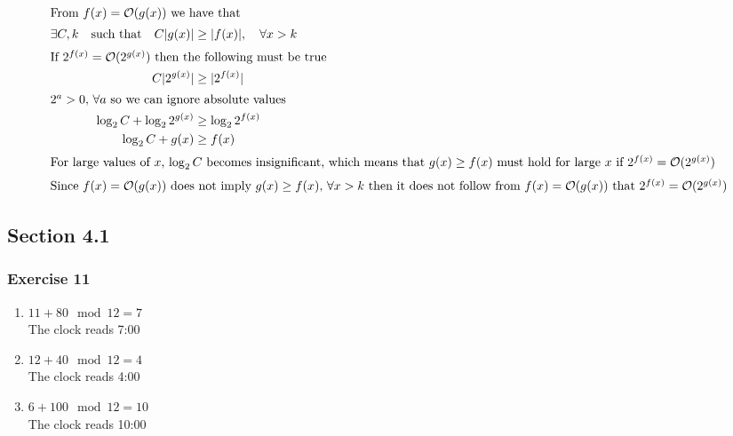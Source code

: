 \documentclass[a4paper]{article}
\newcommand{\ex}[1]{\subsubsection*{#1}}
\begin{document}
\begin{align}
    \intertext{From \(f(x) = \mathcal{O}(g(x))\) we have that}
    \exists C, k \quad \text{such\ that} \quad C|g(x)| &\geq |f(x)|, \quad \forall x > k \\
    \intertext{If \(2^{f(x)} = \mathcal{O}(2^{g(x)})\) then the following must be true}
    C|2^{g(x)}| &\geq |2^{f(x)}| \\
    \intertext{\(2^a > 0, \,  \forall a\) so we can ignore absolute values}
    \log_2 C + \log_22^{g(x)} &\geq \log_22^{f(x)} \\
    \log_2 C + g(x) &\geq f(x) \\
    \intertext{For large values of \(x\), \(\log_2 C\) becomes insignificant,
        which means that \(g(x) \geq f(x)\) must hold for large \(x\) if \(2^{f(x)}
        = \mathcal{O}(2^{g(x)})\)}
    \intertext{Since \(f(x) = \mathcal{O}(g(x))\) does not imply \(g(x) \geq
        f(x), \, \forall x > k\) then it does not follow from \(f(x) =
        \mathcal{O}(g(x))\) that \(2^{f(x)} = \mathcal{O}(2^{g(x)})\)}
\end{align}


\subsection*{Section 4.1}
\ex{Exercise 11}

\begin{enumerate}[label=\alph*)]
    \item \(11 + 80 \mod 12 = 7\) \\
        The clock reads 7:00

    \item \(12 + 40 \mod 12 = 4\) \\
        The clock reads 4:00

    \item \(6 + 100 \mod 12 = 10\) \\
        The clock reads 10:00
\end{enumerate}



%
\end{document}
